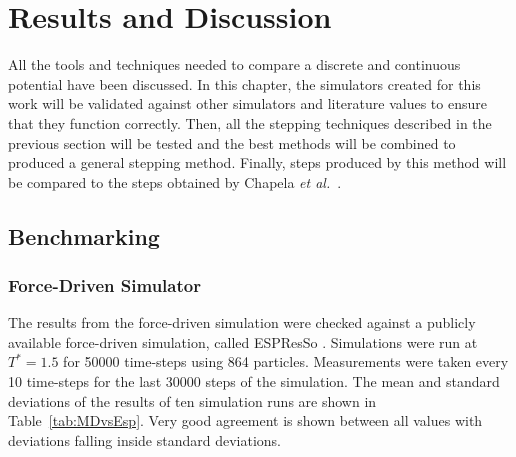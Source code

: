 \documentclass[12pt]{UoAthesis} \usepackage{booktabs}
\begin{document}
\printbibliography[heading=thesisChapterBib]
\chapter{Results and Discussion}

All the tools and techniques needed to compare a discrete and
continuous potential have been discussed.  In this chapter, the
simulators created for this work will be validated against other
simulators and literature values to ensure that they function
correctly.  Then, all the stepping techniques described in the previous
section will be tested and the best methods will be combined to
produced a general stepping method. Finally, steps produced by this
method will be compared to the steps obtained by Chapela \textit{et
  al.}~\cite{Chapela1989}.

\section{Benchmarking} 

\subsection{Force-Driven Simulator}
The results from the force-driven simulation were checked against a
publicly available force-driven simulation, called ESPResSo
\cite{Limbach2006}.  Simulations were run at $T^*=1.5$ for 50000
time-steps using 864 particles. Measurements were taken every 10
time-steps for the last 30000 steps of the simulation. The mean and
standard deviations of the results of ten simulation runs are shown in
Table~\ref{tab:MDvsEsp}. Very good agreement is shown between all
values with deviations falling inside standard deviations.
\end{document}
